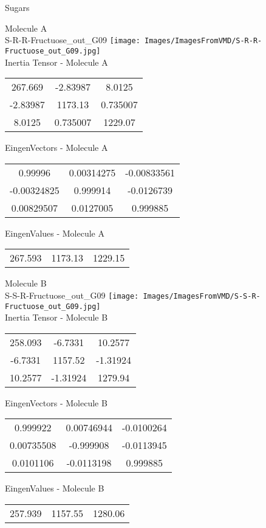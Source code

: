 \vtab[-2cm]
\begin{center}
{\large Sugars}
\end{center}
\begin{multicols}{2}
\begin{center}
Molecule A \\ 
S-R-R-Fructuose\_out\_G09
\texttt{[image: Images/ImagesFromVMD/S-R-R-Fructuose\_out\_G09.jpg]}
\\
Inertia Tensor - Molecule A \\
\vtab
\begin{tabular}{|c c c|}
267.669	 & 	-2.83987	 & 	8.0125	 \\
-2.83987	 & 	1173.13	 & 	0.735007	 \\
8.0125	 & 	0.735007	 & 	1229.07
\end{tabular}

\vtab
 EingenVectors - Molecule A     \\
\vtab
\begin{tabular}{|c c c|}
0.99996	 & 	0.00314275	 & 	-0.00833561	 \\
-0.00324825	 & 	0.999914	 & 	-0.0126739	 \\
0.00829507	 & 	0.0127005	 & 	0.999885
\end{tabular}

\vtab
 EingenValues - Molecule A     \\
\vtab
\begin{tabular}{|c c c|}
267.593	 & 	1173.13	 & 	1229.15
\end{tabular}
\columnbreak

Molecule B \\ 
S-S-R-Fructuose\_out\_G09
\texttt{[image: Images/ImagesFromVMD/S-S-R-Fructuose\_out\_G09.jpg]}
\\
Inertia Tensor - Molecule B \\
\vtab
\begin{tabular}{|c c c|}
258.093	 & 	-6.7331	 & 	10.2577	 \\
-6.7331	 & 	1157.52	 & 	-1.31924	 \\
10.2577	 & 	-1.31924	 & 	1279.94
\end{tabular}

\vtab
 EingenVectors - Molecule B     \\
\vtab
\begin{tabular}{|c c c|}
0.999922	 & 	0.00746944	 & 	-0.0100264	 \\
0.00735508	 & 	-0.999908	 & 	-0.0113945	 \\
0.0101106	 & 	-0.0113198	 & 	0.999885
\end{tabular}

\vtab
 EingenValues - Molecule B     \\
\vtab
\begin{tabular}{|c c c|}
257.939	 & 	1157.55	 & 	1280.06
\end{tabular}

\end{center}
\end{multicols}
